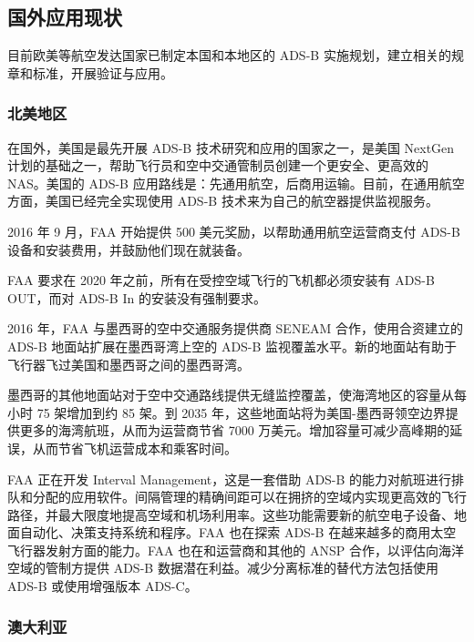 
\subsection{国外应用现状}

目前欧美等航空发达国家已制定本国和本地区的 ADS-B 实施规划，建立相关的规章和标准，开展验证与应用。

\subsubsection{北美地区}

在国外，美国是最先开展 ADS-B 技术研究和应用的国家之一，是美国 NextGen 计划的基础之一，帮助飞行员和空中交通管制员创建一个更安全、更高效的 NAS。美国的 ADS-B 应用路线是：先通用航空，后商用运输。目前，在通用航空方面，美国已经完全实现使用 ADS-B 技术来为自己的航空器提供监视服务。

2016 年 9 月，\acs{FAA} 开始提供 500 美元奖励，以帮助通用航空运营商支付 ADS-B 设备和安装费用，并鼓励他们现在就装备。

FAA 要求在 2020 年之前，所有在受控空域飞行的飞机都必须安装有 ADS-B OUT，而对 ADS-B In 的安装没有强制要求。

2016 年，FAA 与墨西哥的空中交通服务提供商 SENEAM 合作，使用合资建立的 ADS-B 地面站扩展在墨西哥湾上空的 ADS-B 监视覆盖水平。新的地面站有助于飞行器飞过美国和墨西哥之间的墨西哥湾。

墨西哥的其他地面站对于空中交通路线提供无缝监控覆盖，使海湾地区的容量从每小时 75 架增加到约 85 架。到 2035 年，这些地面站将为美国-墨西哥领空边界提供更多的海湾航班，从而为运营商节省 7000 万美元。增加容量可减少高峰期的延误，从而节省飞机运营成本和乘客时间。

FAA 正在开发 Interval Management，这是一套借助 ADS-B 的能力对航班进行排队和分配的应用软件。间隔管理的精确间距可以在拥挤的空域内实现更高效的飞行路径，并最大限度地提高空域和机场利用率。这些功能需要新的航空电子设备、地面自动化、决策支持系统和程序。FAA 也在探索 ADS-B 在越来越多的商用太空飞行器发射方面的能力。FAA 也在和运营商和其他的 \acs{ANSP} 合作，以评估向海洋空域的管制方提供 ADS-B 数据潜在利益。减少分离标准的替代方法包括使用 ADS-B 或使用增强版本 \acs{ADS-C}。

\subsubsection{澳大利亚}

